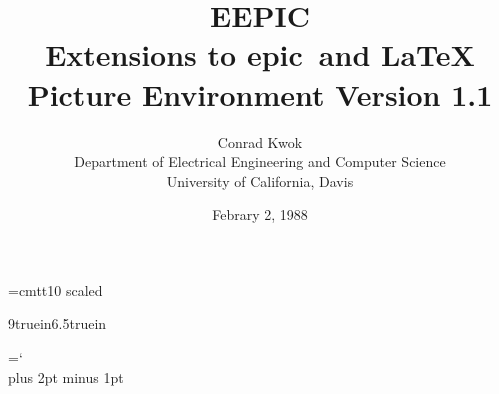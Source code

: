 
% 
% 
% 
\makeatletter
\def\docspecials{\do\ \do\$\do\&%
  \do\#\do\^\do\^^K\do\_\do\^^A\do\%\do\~}
%
\def\alltt{\trivlist \item[]\if@minipage\else\vskip\parskip\fi
\leftskip\@totalleftmargin\rightskip\z@
\parindent\z@\parfillskip\@flushglue\parskip\z@
\@tempswafalse \def\par{\if@tempswa\hbox{}\fi\@tempswatrue\@@par}
\obeylines \tt \catcode``=13 \@noligs \let\do\@makeother \docspecials
 \frenchspacing\@vobeyspaces}
%
\let\endalltt=\endtrivlist
\makeatother
\ifx\twltt\undefined \font\twltt=cmtt10 scaled \fi

\topmargin=-37pt\oddsidemargin=0pt\evensidemargin=0pt
\marginparsep 10pt\marginparwidth 60pt
\textheight 9truein\textwidth 6.5truein

\chardef\BS=`\\ %
\newcommand{\PiCTeX}{PiC\TeX}
\newcommand{\epic}{{\sc epic}}
\newcommand{\eepic}{{\sc eepic}}
\newcommand{\plotchar}{\makebox(0,0){\large $\otimes$}}
\parskip=4pt plus 2pt minus 1pt
\title{EEPIC\\Extensions to epic\ and \LaTeX \\ Picture
Environment Version 1.1}
\author{Conrad Kwok\\
  Department of Electrical Engineering and Computer Science\\
  University of California, Davis}
\date{Febrary 2, 1988}

\maketitle


